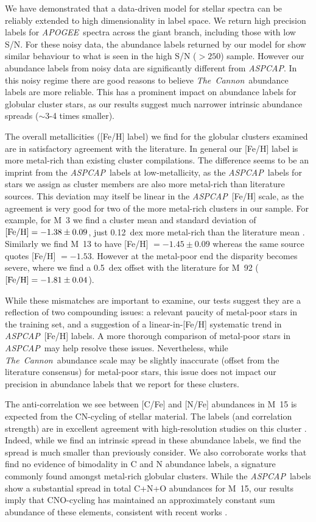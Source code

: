 \documentclass[12pt,preprint]{aastex}
\newcommand{\project}[1]{\textsl{#1}}
\newcommand{\TheCannon}{\project{The~Cannon}}
\newcommand{\acronym}[1]{{\small{#1}}}
\newcommand{\apogee}{\project{\acronym{APOGEE}}}
\newcommand{\aspcap}{\project{\acronym{ASPCAP}}}
\begin{document}
We have demonstrated that a data-driven model for stellar spectra can be
reliably extended to high dimensionality in label space. We return high
precision labels for \apogee\ spectra across the giant branch, including
those with low S/N. For these noisy data, the abundance labels returned
by our model for show similar behaviour to what is seen in the high
S/N ($>250$) sample.  However our abundance labels from noisy data are
significantly different from \aspcap. In this noisy regime
there are good reasons to believe \TheCannon\ abundance labels are more
reliable.  This has a prominent impact on abundance labels for globular
cluster stars, as our results suggest much narrower intrinsic abundance
spreads ($\sim$3-4 times smaller).


The overall metallicities ([Fe/H] label) we find for the globular
clusters examined are in satisfactory agreement with the literature.  In
general our [Fe/H] label is more metal-rich than existing cluster
compilations.  The difference seems to be an imprint from
the \aspcap\ labels at low-metallicity, as the \aspcap\ labels for 
stars we assign as cluster members are also more metal-rich than
literature sources. This deviation may itself be linear in the 
\aspcap\ [Fe/H] scale, as the agreement is very good for two of the
more metal-rich clusters in our sample.  For example, for M~3 we find a cluster mean and standard
deviation of $[{\rm Fe/H}] = -1.38 \pm 0.09$, just 0.12~dex more metal-rich
than the literature mean \citep{Harris}.  Similarly we find M~13 to have
[Fe/H] $= -1.45 \pm 0.09$ whereas the same source quotes [Fe/H] $= -1.53$.
However at the metal-poor end the disparity becomes severe, where we find
a 0.5~dex offset with the literature for M~92 ($[{\rm Fe/H}] = -1.81 \pm 0.04$).


While these mismatches are important to examine, our tests suggest they
are a reflection of two compounding issues: a relevant paucity of metal-poor
stars in the training set, and a suggestion of a linear-in-[Fe/H] systematic
trend in \aspcap\ [Fe/H] labels.  A more thorough comparison of metal-poor
stars in \aspcap\ may help resolve these issues.  Nevertheless, while
\TheCannon\ abundance scale may be slightly inaccurate (offset from the
literature consensus) for metal-poor stars, this issue does not impact
our precision in abundance labels that we report for these clusters.  



The anti-correlation we see between [C/Fe] and [N/Fe] abundances in M~15 is
expected from the CN-cycling of stellar material.  The labels (and correlation
strength) are in excellent agreement with high-resolution studies on this cluster
\citep{Cohen_2005}.  Indeed, while we find an intrinsic spread in these abundance
labels, we find the spread is much smaller than previously consider.  We also
corroborate works that find no evidence of bimodality in C and N 
abundance labels, a signature commonly found amongst metal-rich globular clusters.
While the \aspcap\ labels show a substantial spread in total C+N+O abundances
for M~15, our results imply that CNO-cycling has maintained an approximately
constant sum abundance of these elements, consistent with recent works
\citep{Meszaros_2015}.
\end{document}
